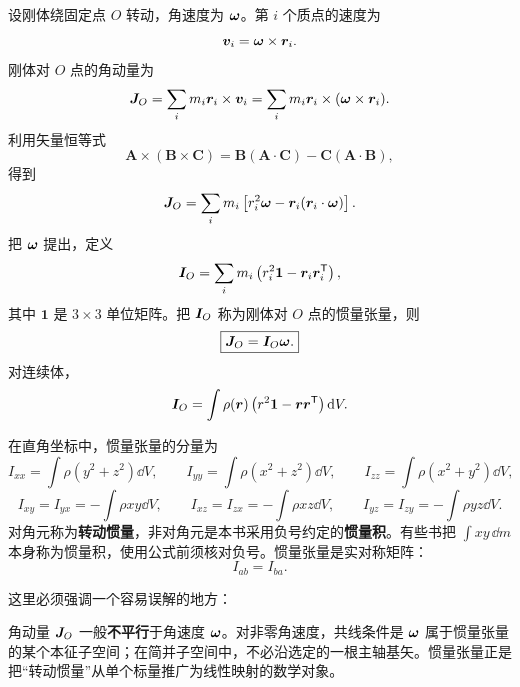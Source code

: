 设刚体绕固定点 \(O\) 转动，角速度为 \(\boldsymbol{\omega}\)。第 \(i\) 个质点的速度为
\[
\boldsymbol{v}_i=\boldsymbol{\omega}\times\boldsymbol{r}_i.
\]
刚体对 \(O\) 点的角动量为
\begin{equation}
\boldsymbol{J}_O=\sum_i m_i\boldsymbol{r}_i\times\boldsymbol{v}_i
=\sum_i m_i\boldsymbol{r}_i\times(\boldsymbol{\omega}\times\boldsymbol{r}_i).
\label{eq:angular-momentum-def}
\end{equation}
利用矢量恒等式
\[
\boldsymbol{A}\times(\boldsymbol{B}\times\boldsymbol{C})
=\boldsymbol{B}(\boldsymbol{A}\cdot\boldsymbol{C})-\boldsymbol{C}(\boldsymbol{A}\cdot\boldsymbol{B}),
\]
得到
\begin{equation}
\boldsymbol{J}_O=\sum_i m_i\left[r_i^2\boldsymbol{\omega}-\boldsymbol{r}_i(\boldsymbol{r}_i\cdot\boldsymbol{\omega})\right].
\label{eq:angular-momentum-intermediate}
\end{equation}
把 \(\boldsymbol{\omega}\) 提出，定义
\begin{equation}
\boldsymbol{I}_O=\sum_i m_i\left(r_i^2\mathbf 1-\boldsymbol{r}_i\boldsymbol{r}_i^{\mathsf T}\right),
\label{eq:inertia-tensor-discrete}
\end{equation}
其中 \(\mathbf 1\) 是 \(3\times3\) 单位矩阵。把 \(\boldsymbol{I}_O\) 称为刚体对 \(O\) 点的惯量张量，则
\begin{equation}
\boxed{\boldsymbol{J}_O=\boldsymbol{I}_O\boldsymbol{\omega}.}
\label{eq:J-equals-I-omega}
\end{equation}
对连续体，
\begin{equation}
\boldsymbol{I}_O=\int \rho(\boldsymbol{r})\left(r^2\mathbf 1-\boldsymbol{r}\boldsymbol{r}^{\mathsf T}\right)\mathrm{d} V.
\label{eq:inertia-tensor-continuous}
\end{equation}

在直角坐标中，惯量张量的分量为
\begin{equation}
I_{xx}=\int\rho(y^2+z^2)\dd V,\qquad
I_{yy}=\int\rho(x^2+z^2)\dd V,\qquad
I_{zz}=\int\rho(x^2+y^2)\dd V,
\label{eq:inertia-diagonal}
\end{equation}
\begin{equation}
I_{xy}=I_{yx}=-\int\rho xy\dd V,\qquad
I_{xz}=I_{zx}=-\int\rho xz\dd V,\qquad
I_{yz}=I_{zy}=-\int\rho yz\dd V.
\label{eq:inertia-offdiagonal}
\end{equation}
对角元称为\textbf{转动惯量}，非对角元是本书采用负号约定的\textbf{惯量积}。有些书把 $\int xy\,\dd m$ 本身称为惯量积，使用公式前须核对负号。惯量张量是实对称矩阵：
\[
I_{ab}=I_{ba}.
\]

这里必须强调一个容易误解的地方：

\begin{keybox}
角动量 \(\boldsymbol{J}_O\) 一般\textbf{不平行}于角速度 \(\boldsymbol{\omega}\)。对非零角速度，共线条件是 $\boldsymbol{\omega}$ 属于惯量张量的某个本征子空间；在简并子空间中，不必沿选定的一根主轴基矢。惯量张量正是把“转动惯量”从单个标量推广为线性映射的数学对象。
\end{keybox}


